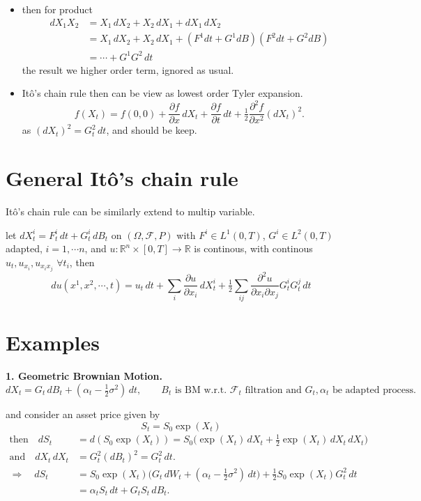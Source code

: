 \documentclass[
  letterpaper,
  DIV=11,
  numbers=noendperiod]{scrreprt}
\theoremstyle{definition}
\theoremstyle{plain}
\theoremstyle{plain}
\theoremstyle{definition}
\theoremstyle{plain}
\theoremstyle{plain}
\theoremstyle{remark}
\begin{document}
\begin{itemize}
\item
  then for product \[
  \begin{aligned}
  d X_1 X_2 &= X_1 \, dX_2 + X_2 \, dX_1 + dX_1 \, dX_2 \\
  &= X_1 \, dX_2 + X_2 \, dX_1 + (F^1 dt + G^1 dB)(F^2 dt + G^2 dB) \\
  &= \cdots + G^1 G^2 \, dt
  \end{aligned}
  \] the result we higher order term, ignored as usual.
\item
  Itô's chain rule then can be view as lowest order Tyler expansion. \[
  f(X_t) = f(0,0) + \frac{\partial f}{\partial x} \, dX_t + \frac{\partial f}{\partial t} \, dt + \tfrac12 \frac{\partial^2 f}{\partial x^2}(dX_t)^2.
  \] as \((dX_t)^2 = G_t^2 \, dt\), and should be keep.
\end{itemize}

\section{General Itô's chain rule}\label{general-ituxf4s-chain-rule}

Itô's chain rule can be similarly extend to multip variable.

let \(dX_t^i = F_t^i \, dt + G_t^i \, dB_t\) on
\((\Omega, \mathcal{F}, P)\) with \(F^i \in L^1(0,T)\),
\(G^i \in L^2(0,T)\) adapted, \(i = 1, \cdots n\), and
\(u: \mathbb{R}^n \times [0,T] \to \mathbb{R}\) is continous, with
continous \(u_t, u_{x_i}, u_{x_i x_j}\) \(\forall t_i\), then \[
d u(x^1, x^2, \cdots, t) = u_t \, dt + \sum_i \frac{\partial u}{\partial x_i} \, dX_t^i + \tfrac12 \sum_{ij} \frac{\partial^2 u}{\partial x_i \partial x_j} G_t^i G_t^j \, dt
\]

\section{Examples}\label{examples}

\textbf{1. Geometric Brownian Motion.} \[
dX_t = G_t \, dB_t + (\alpha_t - \tfrac12 \sigma^2) \, dt, \qquad B_t \text{ is BM w.r.t. } \mathcal{F}_t \text{ filtration and } G_t, \alpha_t \text{ be adapted process.}
\]

and consider an asset price given by \[
S_t = S_0 \exp(X_t)
\] \[
\begin{aligned}
\text{then} \quad dS_t &= d(S_0 \exp(X_t)) = S_0\big(\exp(X_t) \, dX_t + \tfrac12 \exp(X_t) \, dX_t \, dX_t\big) \\
\text{and} \quad dX_t \, dX_t &= G_t^2 (dB_t)^2 = G_t^2 \, dt. \\
\Rightarrow \quad dS_t &= S_0 \exp(X_t)\big(G_t \, dW_t + (\alpha_t - \tfrac12 \sigma^2) \, dt\big) + \tfrac12 S_0 \exp(X_t) G_t^2 \, dt \\
&= \alpha_t S_t \, dt + G_t S_t \, dB_t.
\end{aligned}
\]
\end{document}

